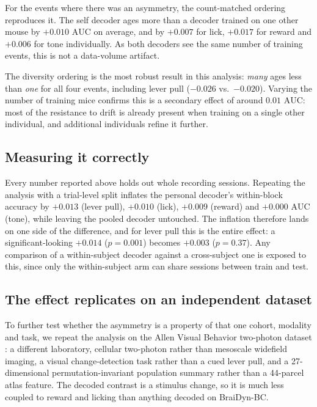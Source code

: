 \documentclass{article}
\newcommand{\auc}{\mathrm{AUC}}
\begin{document}
For the events where there was an asymmetry, the count-matched ordering reproduces it. The self
decoder ages more than a decoder trained on one other mouse by $+0.010$ $\auc$ on average, and by
$+0.007$ for lick, $+0.017$ for reward and $+0.006$ for tone individually. As both decoders see the
same number of training events, this is not a data-volume artifact.

The diversity ordering is the most robust result in this analysis: \emph{many} ages less than
\emph{one} for all four events, including lever pull ($-0.026$ vs.\ $-0.020$). Varying the number of
training mice confirms this is a secondary effect of around $0.01$ $\auc$: most of the resistance to
drift is already present when training on a single other individual, and additional individuals
refine it further.



\subsection{Measuring it correctly}
\label{sec:protocol}
Every number reported above holds out whole recording sessions. Repeating the analysis with a
trial-level split inflates the personal decoder's within-block accuracy by $+0.013$ (lever pull),
$+0.010$ (lick), $+0.009$ (reward) and $+0.000$ $\auc$ (tone), while leaving the pooled decoder
untouched. The inflation therefore lands on one side of the difference, and for lever pull this is
the entire effect: a significant-looking $+0.014$ ($p = 0.001$) becomes $+0.003$ ($p = 0.37$). Any
comparison of a within-subject decoder against a cross-subject one is exposed to this, since only
the within-subject arm can share sessions between train and test.

\subsection{The effect replicates on an independent dataset}
\label{sec:allen}
To further test whether the asymmetry is a property of that one cohort, modality and task, we
repeat the analysis on the Allen Visual Behavior two-photon dataset \citep{allenvb2023}: a different
laboratory, cellular two-photon rather than mesoscale widefield imaging, a visual change-detection
task rather than a cued lever pull, and a 27-dimensional permutation-invariant population summary
rather than a 44-parcel atlas feature. The decoded contrast is a stimulus change, so it is much less
coupled to reward and licking than anything decoded on BraiDyn-BC.
\end{document}
